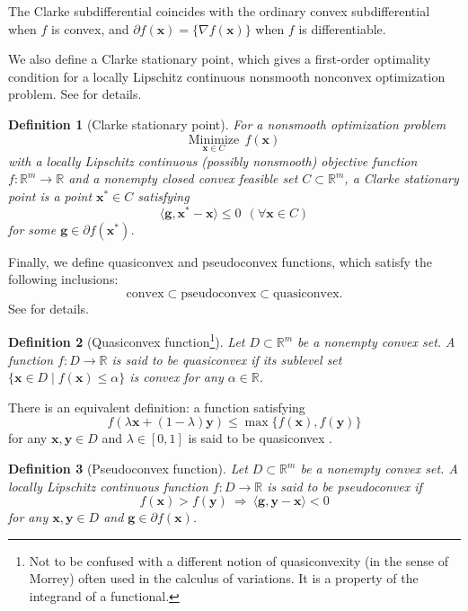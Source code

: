 \documentclass[sn-mathphys,Numbered]{sn-jnl}%
\theoremstyle{thmstyleone}%
\theoremstyle{thmstyletwo}%
\theoremstyle{thmstylethree}%
\newtheorem{definition}{Definition}%
\newcommand{\e}[1]{\begin{equation}#1\end{equation}}
\newcommand{\en}[1]{\begin{equation}#1\nonumber\end{equation}}
\def\rm{\mathbb{R}^m}
\def\cpartial{\partial}
\begin{document}
The Clarke subdifferential coincides with the ordinary convex subdifferential when $f$ is convex, and $\cpartial f(\bm{x})=\{\nabla f(\bm{x})\}$ when $f$ is differentiable.

We also define a Clarke stationary point, which gives a first-order optimality condition for a locally Lipschitz continuous nonsmooth nonconvex optimization problem. See \cite{zhang09} for details.

\begin{definition}[Clarke stationary point]
For a nonsmooth optimization problem
\begin{equation}
    \underset{\bm{x}\in C}{\mathrm{Minimize}}\ \ f(\bm{x})\label{original}
\end{equation}
with a locally Lipschitz continuous (possibly nonsmooth) objective function $f:\rm\to\mathbb{R}$ and a nonempty closed convex feasible set $C\subset\rm$, a Clarke stationary point is a point $\bm{x}^*\in C$ satisfying
\begin{equation}
    \langle \bm{g},\bm{x}^*-\bm{x}\rangle\le0\ \ (\forall\bm{x}\in C)
    \label{stationary}
\end{equation}
for some $\bm{g}\in\partial f(\bm{x}^*)$.
\end{definition}

Finally, we define quasiconvex and pseudoconvex functions, which satisfy the following inclusions:
\en{
\text{convex}\subset\text{pseudoconvex}\subset\text{quasiconvex}.
}
See \cite{kiwiel01,penot97,soleimani07} for details.

\begin{definition}[Quasiconvex function\footnote{Not to be confused with a different notion of quasiconvexity (in the sense of Morrey) \cite{morrey52} often used in the calculus of variations. It is a property of the integrand of a functional.}]
Let $D\subset\rm$ be a nonempty convex set. A function $f:D\to\mathbb{R}$ is said to be quasiconvex if its sublevel set $
\{\bm{x}\in D \mid f(\bm{x})\le\alpha\}$ is convex for any $\alpha\in\mathbb{R}$.
\end{definition}

There is an equivalent definition: a function satisfying 
\e{
f(\lambda\bm{x}+(1-\lambda)\bm{y}) \le \max\{f(\bm{x}),f(\bm{y})\}
\label{quasi2}
}
for any $\bm{x},\bm{y}\in D$ and $\lambda\in[0,1]$ is said to be quasiconvex \cite{soleimani07}. 

\begin{definition}[Pseudoconvex function]
Let $D\subset\rm$ be a nonempty convex set. A locally Lipschitz continuous function $f:D\to\mathbb{R}$ is said to be pseudoconvex if
\e{
f(\bm{x})>f(\bm{y})\ \Rightarrow\ \langle \bm{g},\bm{y}-\bm{x} \rangle < 0
\label{pse}
}
for any $\bm{x},\bm{y}\in D$ and $\bm{g}\in\cpartial f(\bm{x})$.
\end{definition}
\end{document}
